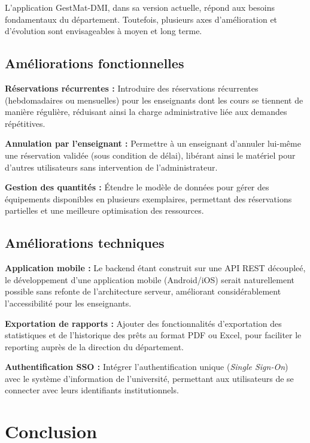\documentclass[12pt,a4paper]{report}
\begin{document}
L'application GestMat-DMI, dans sa version actuelle, r\'epond aux besoins
fondamentaux du d\'epartement. Toutefois, plusieurs axes d'am\'elioration
et d'\'evolution sont envisageables \`a moyen et long terme.

\section{Am\'eliorations fonctionnelles}

\textbf{R\'eservations r\'ecurrentes :} Introduire des r\'eservations
r\'ecurrentes (hebdomadaires ou mensuelles) pour les enseignants dont les
cours se tiennent de mani\`ere r\'eguli\`ere, r\'eduisant ainsi la charge
administrative li\'ee aux demandes r\'ep\'etitives.

\textbf{Annulation par l'enseignant :} Permettre \`a un enseignant
d'annuler lui-m\^eme une r\'eservation valid\'ee (sous condition de d\'elai),
lib\'erant ainsi le mat\'eriel pour d'autres utilisateurs sans intervention
de l'administrateur.

\textbf{Gestion des quantit\'es :} \'Etendre le mod\`ele de donn\'ees pour
g\'erer des \'equipements disponibles en plusieurs exemplaires, permettant
des r\'eservations partielles et une meilleure optimisation des ressources.

\section{Am\'eliorations techniques}

\textbf{Application mobile :} Le backend \'etant construit sur une API
REST d\'ecouple\'e, le d\'eveloppement d'une application mobile
(Android/iOS) serait naturellement possible sans refonte de l'architecture
serveur, am\'eliorant consid\'erablement l'accessibilit\'e pour les
enseignants.

\textbf{Exportation de rapports :} Ajouter des fonctionnalit\'es
d'exportation des statistiques et de l'historique des pr\^ets au format
PDF ou Excel, pour faciliter le reporting aupr\`es de la direction du
d\'epartement.

\textbf{Authentification SSO :} Int\'egrer l'authentification unique
(\textit{Single Sign-On}) avec le syst\`eme d'information de l'universit\'e,
permettant aux utilisateurs de se connecter avec leurs identifiants
institutionnels.

\chapter{Conclusion}
\end{document}
